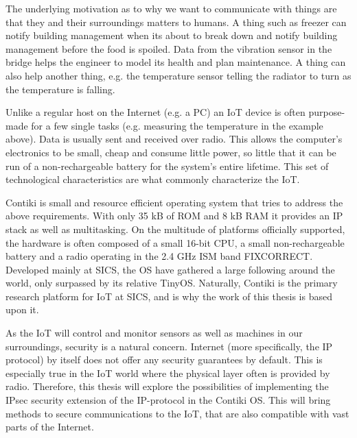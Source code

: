 \documentclass[final,letterpaper,twoside,12pt,twocolumn]{report}
\begin{document}
The underlying motivation as to why we want to communicate with things are that they and their surroundings matters to humans. A thing such as freezer can notify building management when its about to break down and notify building management before the food is spoiled. Data from the vibration sensor in the bridge helps the engineer to model its health and plan maintenance. A thing can also help another thing, e.g. the temperature sensor telling the radiator to turn as the temperature is falling.


Unlike a regular host on the Internet (e.g. a PC) an IoT device is often purpose-made for a few single tasks (e.g. measuring the temperature in the example above). Data is usually sent and received over radio. This allows the computer's electronics to be small, cheap and consume little power, so little that it can be run of a non-rechargeable battery for the system's entire lifetime. This set of technological characteristics are what commonly characterize the IoT.


Contiki is small and resource efficient operating system that tries to address the above requirements. With only 35 kB of ROM and 8 kB RAM it provides an IP stack as well as multitasking. On the multitude of platforms officially supported, the hardware is often composed of a small 16-bit CPU, a small non-rechargeable battery and a radio operating in the 2.4 GHz ISM band FIXCORRECT. Developed mainly at SICS, the OS have gathered a large following around the world, only surpassed by its relative TinyOS. Naturally, Contiki is the primary research platform for IoT at SICS, and is why the work of this thesis is based upon it.

As the IoT will control and monitor sensors as well as machines in our surroundings, security is a natural concern. Internet (more specifically, the IP protocol) by itself does not offer any security guarantees by default. This is especially true in the IoT world where the physical layer often is provided by radio. Therefore, this thesis will explore the possibilities of implementing the IPsec security extension of the IP-protocol in the Contiki OS. This will bring methods to secure communications to the IoT, that are also compatible with vast parts of the Internet.
\end{document}
